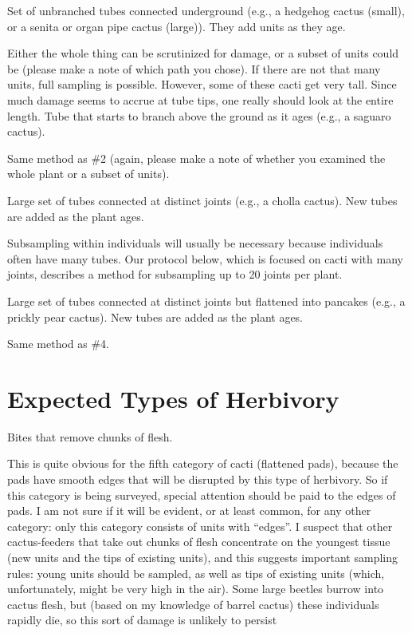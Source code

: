 \documentclass[
  letterpaper,
  oneside,
  open=any]{scrbook}
\begin{document}
Set of unbranched tubes connected underground (e.g., a hedgehog cactus
(small), or a senita or organ pipe cactus (large)). They add units as
they age.

Either the whole thing can be scrutinized for damage, or a subset of
units could be (please make a note of which path you chose). If there
are not that many units, full sampling is possible. However, some of
these cacti get very tall. Since much damage seems to accrue at tube
tips, one really should look at the entire length. Tube that starts to
branch above the ground as it ages (e.g., a saguaro cactus).

Same method as \#2 (again, please make a note of whether you examined
the whole plant or a subset of units).

Large set of tubes connected at distinct joints (e.g., a cholla cactus).
New tubes are added as the plant ages.

Subsampling within individuals will usually be necessary because
individuals often have many tubes. Our protocol below, which is focused
on cacti with many joints, describes a method for subsampling up to 20
joints per plant.

Large set of tubes connected at distinct joints but flattened into
pancakes (e.g., a prickly pear cactus). New tubes are added as the plant
ages.

Same method as \#4.

\section{Expected Types of Herbivory}\label{expected-types-of-herbivory}

Bites that remove chunks of flesh.

This is quite obvious for the fifth category of cacti (flattened pads),
because the pads have smooth edges that will be disrupted by this type
of herbivory. So if this category is being surveyed, special attention
should be paid to the edges of pads. I am not sure if it will be
evident, or at least common, for any other category: only this category
consists of units with ``edges''. I suspect that other cactus-feeders
that take out chunks of flesh concentrate on the youngest tissue (new
units and the tips of existing units), and this suggests important
sampling rules: young units should be sampled, as well as tips of
existing units (which, unfortunately, might be very high in the air).
Some large beetles burrow into cactus flesh, but (based on my knowledge
of barrel cactus) these individuals rapidly die, so this sort of damage
is unlikely to persist
\end{document}
